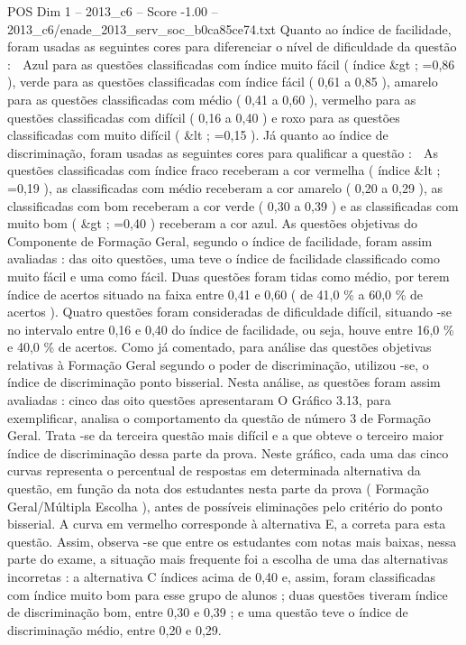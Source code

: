 \begin{textsample}{POS Dim 1 – 2013\_c6 – Score -1.00 – 2013\_c6/enade\_2013\_serv\_soc\_b0ca85ce74.txt}
Quanto ao índice de facilidade, foram usadas as seguintes cores para diferenciar o nível de dificuldade da questão :  Azul para as questões classificadas com índice muito fácil ( índice \&gt ; =0,86 ), verde para as questões classificadas com índice fácil ( 0,61 a 0,85 ), amarelo para as questões classificadas com médio ( 0,41 a 0,60 ), vermelho para as questões classificadas com difícil ( 0,16 a 0,40 ) e roxo para as questões classificadas com muito difícil ( \&lt ; =0,15 ).
Já quanto ao índice de discriminação, foram usadas as seguintes cores para qualificar a questão :  As questões classificadas com índice fraco receberam a cor vermelha ( índice \&lt ; =0,19 ), as classificadas com médio receberam a cor amarelo ( 0,20 a 0,29 ), as classificadas com bom receberam a cor verde ( 0,30 a 0,39 ) e as classificadas com muito bom ( \&gt ; =0,40 ) receberam a cor azul.
As questões objetivas do Componente de Formação Geral, segundo o índice de facilidade, foram assim avaliadas : das oito questões, uma teve o índice de facilidade classificado como muito fácil e uma como fácil.
Duas questões foram tidas como médio, por terem índice de acertos situado na faixa entre 0,41 e 0,60 ( de 41,0 \% a 60,0 \% de acertos ).
Quatro questões foram consideradas de dificuldade difícil, situando -se no intervalo entre 0,16 e 0,40 do índice de facilidade, ou seja, houve entre 16,0 \% e 40,0 \% de acertos.
Como já comentado, para análise das questões objetivas relativas à Formação Geral segundo o poder de discriminação, utilizou -se, o índice de discriminação ponto bisserial.
Nesta análise, as questões foram assim avaliadas : cinco das oito questões apresentaram O Gráfico 3.13, para exemplificar, analisa o comportamento da questão de número 3 de Formação Geral.
Trata -se da terceira questão mais difícil e a que obteve o terceiro maior índice de discriminação dessa parte da prova.
Neste gráfico, cada uma das cinco curvas representa o percentual de respostas em determinada alternativa da questão, em função da nota dos estudantes nesta parte da prova ( Formação Geral/Múltipla Escolha ), antes de possíveis eliminações pelo critério do ponto bisserial.
A curva em vermelho corresponde à alternativa E, a correta para esta questão.
Assim, observa -se que entre os estudantes com notas mais baixas, nessa parte do exame, a situação mais frequente foi a escolha de uma das alternativas incorretas : a alternativa C índices acima de 0,40 e, assim, foram classificadas com índice muito bom para esse grupo de alunos ; duas questões tiveram índice de discriminação bom, entre 0,30 e 0,39 ; e uma questão teve o índice de discriminação médio, entre 0,20 e 0,29.

\end{textsample}
